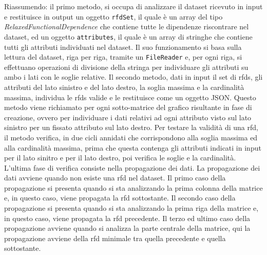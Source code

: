 Riassumendo: il primo metodo, si occupa di analizzare il dataset ricevuto in input e restituisce in output un oggetto \texttt{rfdSet}, il quale \`{e} un array del tipo \textit{RelaxedFunctionalDependence} che contiene tutte le dipendenze riscontrare nel dataset, ed un oggetto \texttt{attributes}, il quale \`{e} un array di stringhe che contiene tutti gli attributi individuati nel dataset. Il suo funzionamento si basa sulla lettura del dataset, riga per riga, tramite un \texttt{FileReader} e, per ogni riga, si effettuano operazioni di divisione della stringa per individuare gli attributi su ambo i lati con le soglie relative. Il secondo metodo, dati in input il set di \acrshort{rfds}, gli attributi del lato sinistro e del lato destro, la soglia massima e la cardinalit\`{a} massima, individua le \acrshort{rfds} valide e le restituisce come un oggetto JSON. Questo metodo viene richiamato per ogni sotto-matrice del grafico risultante in fase di creazione, ovvero per individuare i dati relativi ad ogni attributo visto sul lato sinistro per un fissato attributo sul lato destro. Per testare la validit\`{a} di una \acrshort{rfd}, il metodo verifica, in due cicli annidati che corrispondono alla soglia massima ed alla cardinalit\`{a} massima, prima che questa contenga gli attributi indicati in input per il lato sinitro e per il lato destro, poi verifica le soglie e la cardinalit\`{a}. L'ultima fase di verifica consiste nella propagazione dei dati. La propagazione dei dati avviene quando non esiste una \acrshort{rfd} nel dataset. Il primo caso della propagazione si presenta quando si sta analizzando la prima colonna della matrice e, in questo caso, viene propagata la \acrshort{rfd} sottostante. Il secondo caso della propagazione si presenta quando si sta analizzando la prima riga della matrice e, in questo caso, viene propagata la \acrshort{rfd} precedente. Il terzo ed ultimo caso della propagazione avviene quando si analizza la parte centrale della matrice, qui la propagazione avviene della \acrshort{rfd} minimale tra quella precedente e quella sottostante.


